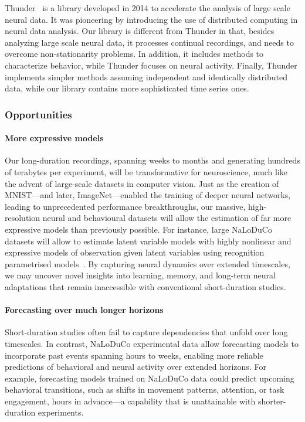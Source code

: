 \documentclass[12pt]{article}
\begin{document}
Thunder~\cite{} is a library developed in 2014 to accelerate the analysis of
large scale neural data. It was pioneering by introducing the use of
distributed computing in neural data analysis.
%
Our library is different from Thunder in that, besides analyzing large scale
neural data, it processes continual recordings, and needs to overcome
non-stationarity problems.
%
In addition, it includes methods to characterize behavior, while
Thunder focuses on neural activity.
%
Finally, Thunder implements simpler methods assuming independent and
identically distributed data, while our library contains more sophisticated
time series ones.

\subsubsection{Opportunities}

\paragraph{More expressive models}
%
Our long-duration recordings, spanning weeks to months and generating hundreds
of terabytes per experiment, will be transformative for neuroscience, much like
the advent of large-scale datasets in computer vision.  Just as the creation of
MNIST—and later, ImageNet—enabled the training of deeper neural networks,
leading to unprecedented performance breakthroughs, our massive,
high-resolution neural and behavioural datasets will allow the estimation of far
more expressive models than previously possible.
%
For instance, large NaLoDuCo datasets will allow to estimate latent variable
models with highly nonlinear and expressive models of observation given latent
variables using recognition parametrised models~\citep{walkerEtAl23}.
%
By capturing neural dynamics over extended timescales, we may uncover novel
insights into learning, memory, and long-term neural adaptations that remain
inaccessible with conventional short-duration studies.

\paragraph{Forecasting over much longer horizons}
%
Short-duration studies often fail to capture dependencies that unfold over long
timescales. In contrast, NaLoDuCo experimental data allow forecasting models to
incorporate past events spanning hours to weeks, enabling more reliable
predictions of behavioral and neural activity over extended horizons.
%
For example, forecasting models trained on NaLoDuCo data could predict upcoming
behavioral transitions, such as shifts in movement patterns, attention, or task
engagement, hours in advance—a capability that is unattainable with
shorter-duration experiments.
\end{document}
